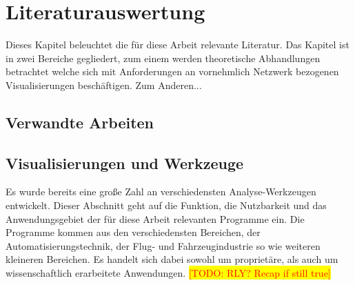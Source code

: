 \documentclass[draft=false
              ,paper=a4
              ,twoside=false
              ,fontsize=11pt
              ,headsepline
              ,BCOR10mm
              ,DIV11
              ]{scrbook}
\newcommand{\TODO}[1]{\colorbox{yellow}{\textcolor{red}{[TODO: #1]}}}
\begin{document}

\chapter{Literaturauswertung} %
\label{cha:literaturauswertung}

Dieses Kapitel beleuchtet die für diese Arbeit relevante Literatur. Das Kapitel ist in zwei Bereiche gegliedert, zum einem werden theoretische Abhandlungen betrachtet welche sich mit Anforderungen an vornehmlich Netzwerk bezogenen Visualisierungen beschäftigen. Zum Anderen...

\section{Verwandte Arbeiten} %
\label{sec:verwandte_arbeiten}

\section{Visualisierungen und Werkzeuge} %
\label{sec:anwendungen_und_werkzeuge}
Es wurde bereits eine große Zahl an verschiedensten Analyse-Werkzeugen entwickelt. Dieser Abschnitt geht auf die Funktion, die Nutzbarkeit und das Anwendungsgebiet der für diese Arbeit relevanten Programme ein. Die Programme kommen aus den verschiedensten Bereichen, der Automatisierungstechnik, der Flug- und Fahrzeugindustrie so wie weiteren kleineren Bereichen. Es handelt sich dabei sowohl um proprietäre, als auch um wissenschaftlich erarbeitete Anwendungen. 
\iffalse\TODO{RLY? Recap if still true} 
\end{document}
